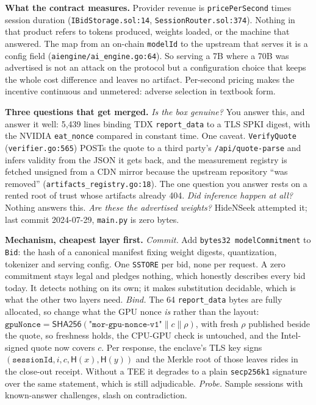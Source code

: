 \documentclass[10pt,a4paper]{article}
\newcommand{\code}[1]{\texttt{\small #1}}
\begin{document}

\noindent\textbf{What the contract measures.}
Provider revenue is \code{pricePerSecond} times session duration
(\code{IBidStorage.sol:14}, \code{SessionRouter.sol:374}). Nothing in that
product refers to tokens produced, weights loaded, or the machine that answered.
The map from an on-chain \code{modelId} to the upstream that serves it is a
config field (\code{aiengine/ai\_engine.go:64}). So serving a 7B where a 70B was
advertised is not an attack on the protocol but a
configuration choice that keeps the whole cost difference and leaves no artifact.
Per-second pricing makes the incentive continuous and unmetered: adverse
selection in textbook form.

\vspace{0.35ex}
\noindent\textbf{Three questions that get merged.}
\emph{Is the box genuine?} You answer this, and answer it well: 5{,}439 lines
binding TDX \code{report\_data} to a TLS SPKI digest, with the NVIDIA
\code{eat\_nonce} compared in constant time. One caveat. \code{VerifyQuote}
(\code{verifier.go:565}) POSTs the quote to a third party's
\code{/api/quote-parse} and infers validity from the JSON it gets back, and the
measurement registry is fetched unsigned from a CDN mirror because the
upstream repository ``was removed'' (\code{artifacts\_registry.go:18}). The one
question you answer rests on a rented root of trust whose artifacts already 404. \emph{Did inference happen at all?} Nothing answers this. \emph{Are these
the advertised weights?} HideNSeek attempted it; last commit 2024-07-29,
\code{main.py} is zero bytes.

\vspace{0.35ex}
\noindent\textbf{Mechanism, cheapest layer first.}
\emph{Commit.} Add \code{bytes32 modelCommitment} to \code{Bid}: the hash of a
canonical manifest fixing weight digests, quantization, tokenizer and serving
config. One \code{SSTORE} per bid, none per request. A zero commitment stays
legal and pledges nothing, which honestly describes every bid today. It detects
nothing on its own; it makes substitution decidable, which is what the other two
layers need. \emph{Bind.} The 64
\code{report\_data} bytes are fully allocated, so change what the GPU nonce
\emph{is} rather than the layout:
$\texttt{gpuNonce} = \mathsf{SHA256}(\texttt{"mor-gpu-nonce-v1"} \| c \| \rho)$,
with fresh $\rho$ published beside the quote, so freshness holds, the CPU-GPU
check is untouched, and the Intel-signed quote now covers $c$. Per
response, the enclave's TLS key signs
$(\texttt{sessionId}, i, c, \mathsf{H}(x), \mathsf{H}(y))$ and the Merkle root of
those leaves rides in the close-out receipt. Without a TEE it degrades to a plain
\code{secp256k1} signature over the same statement, which is still adjudicable.
\emph{Probe.} Sample sessions with known-answer challenges, slash on
contradiction.
\end{document}

